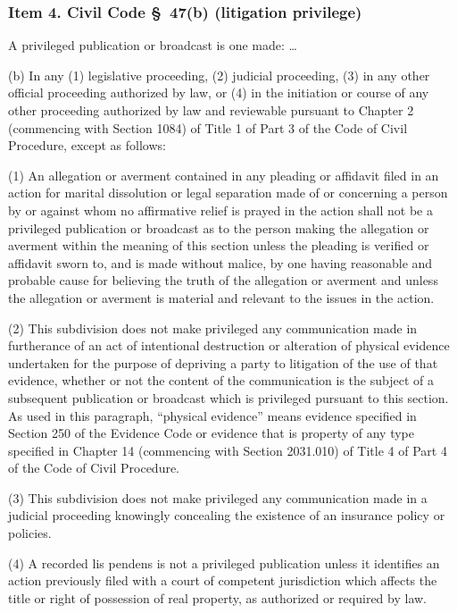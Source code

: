 \subsubsection*{Item 4. Civil Code \S~47(b) (litigation privilege)}

\begin{quoting}
\noindent A privileged publication or broadcast is one made: \dots

\noindent (b) In any (1) legislative proceeding, (2) judicial proceeding, (3) in any other official proceeding authorized by law, or (4) in the initiation or course of any other proceeding authorized by law and reviewable pursuant to Chapter 2 (commencing with Section 1084) of Title 1 of Part 3 of the Code of Civil Procedure, except as follows:

\noindent (1) An allegation or averment contained in any pleading or affidavit filed in an action for marital dissolution or legal separation made of or concerning a person by or against whom no affirmative relief is prayed in the action shall not be a privileged publication or broadcast as to the person making the allegation or averment within the meaning of this section unless the pleading is verified or affidavit sworn to, and is made without malice, by one having reasonable and probable cause for believing the truth of the allegation or averment and unless the allegation or averment is material and relevant to the issues in the action.

\noindent (2) This subdivision does not make privileged any communication made in furtherance of an act of intentional destruction or alteration of physical evidence undertaken for the purpose of depriving a party to litigation of the use of that evidence, whether or not the content of the communication is the subject of a subsequent publication or broadcast which is privileged pursuant to this section. As used in this paragraph, ``physical evidence'' means evidence specified in Section 250 of the Evidence Code or evidence that is property of any type specified in Chapter 14 (commencing with Section 2031.010) of Title 4 of Part 4 of the Code of Civil Procedure.

\noindent (3) This subdivision does not make privileged any communication made in a judicial proceeding knowingly concealing the existence of an insurance policy or policies.

\noindent (4) A recorded lis pendens is not a privileged publication unless it identifies an action previously filed with a court of competent jurisdiction which affects the title or right of possession of real property, as authorized or required by law.
\end{quoting}

